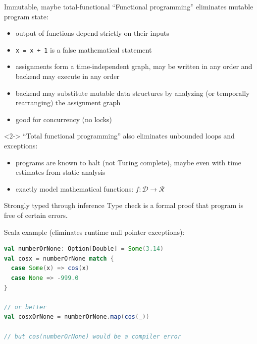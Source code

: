 \documentclass{beamer}
\begin{document}
\begin{frame}{Immutable, maybe total-functional}
\vfill
``Functional programming'' eliminates mutable program state:
\begin{itemize}
\item output of functions depend strictly on their inputs
\item {\tt \small x = x + 1} is a false mathematical statement
\item assignments form a time-independent graph, may be written in any order and backend may execute in any order
\item backend may substitute mutable data structures by analyzing (or temporally rearranging) the assignment graph
\item good for concurrency (no locks)
\end{itemize}

\vfill
\begin{uncoverenv}<2->
``Total functional programming'' also eliminates unbounded loops and exceptions:
\begin{itemize}
\item programs are known to halt (not Turing complete), maybe even with time estimates from static analysis
\item exactly model mathematical functions: $f: \mathcal{D} \to \mathcal{R}$
\end{itemize}
\end{uncoverenv}
\end{frame}

\begin{frame}[fragile]{Strongly typed through inference}
\vfill
Type check is a formal proof that program is free of certain errors.

\vfill
Scala example (eliminates runtime null pointer exceptions):
\begin{lstlisting}[language=scala]
val numberOrNone: Option[Double] = Some(3.14)
val cosx = numberOrNone match {
  case Some(x) => cos(x)
  case None => -999.0
}

// or better
val cosxOrNone = numberOrNone.map(cos(_))

// but cos(numberOrNone) would be a compiler error
\end{lstlisting}
\end{frame}
\end{document}
